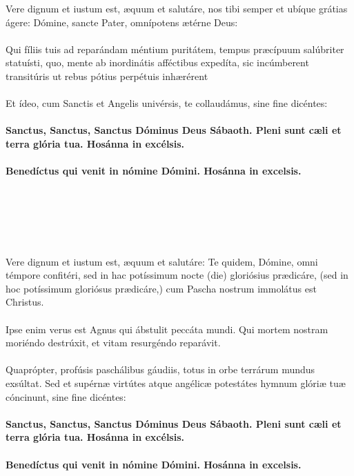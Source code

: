 \documentclass[12pt, a4paper]{article}
\begin{document}
	\\
	\\
	\\
	\\
	\\
	Vere dignum et iustum est, æquum
	et salutáre, nos tibi semper et
	ubíque grátias ágere: Dómine,
	sancte Pater, omnípotens ætérne
	Deus:
	\\\\
	Qui fíliis tuis ad reparándam
	méntium puritátem, tempus
	præcípuum salúbriter statuísti, quo,
	mente ab inordinátis afféctibus
	expedíta, sic incúmberent
	transitúris ut rebus pótius perpétuis
	inhærérent
	\\\\
	Et ídeo, cum Sanctis et Angelis
	univérsis, te collaudámus, sine fine
	dicéntes:
	\\\\
	\textbf{Sanctus, Sanctus, Sanctus Dóminus
		Deus Sábaoth. Pleni sunt cæli et
		terra glória tua. Hosánna in
		excélsis.}
	\\\\
	\textbf{Benedíctus qui venit in nómine
		Dómini. Hosánna in excelsis.}
	
	\newpage
	
	\\
	\\
	\\
	\\
	\\
	Vere dignum et iustum est, æquum
	et salutáre: Te quidem, Dómine,
	omni témpore confitéri, sed in hac
	potíssimum nocte (die) gloriósius
	prædicáre, (sed in hoc potíssimum
	gloriósus prædicáre,) cum Pascha
	nostrum immolátus est Christus.
	\\\\
	Ipse enim verus est Agnus qui
	ábstulit peccáta mundi. Qui
	mortem nostram moriéndo
	destrúxit, et vitam resurgéndo
	reparávit.
	\\\\
	Quaprópter, profúsis paschálibus
	gáudiis, totus in orbe terrárum
	mundus exsúltat. Sed et supérnæ
	virtútes atque angélicæ potestátes
	hymnum glóriæ tuæ cóncinunt, sine
	fine dicéntes:
	\\\\
	\textbf{Sanctus, Sanctus, Sanctus Dóminus
		Deus Sábaoth. Pleni sunt cæli et
		terra glória tua. Hosánna in
		excélsis.}
	\\\\
	\textbf{Benedíctus qui venit in nómine
		Dómini. Hosánna in excelsis.}
	
\end{document}
